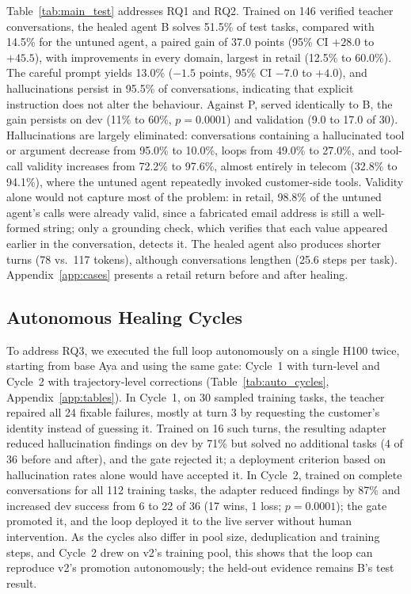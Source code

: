 \documentclass[11pt]{article}
\begin{document}
Table~\ref{tab:main_test} addresses RQ1 and RQ2. Trained on 146 verified teacher conversations, the healed agent B solves 51.5\% of test tasks, compared with 14.5\% for the untuned agent, a paired gain of 37.0 points (95\% CI $+28.0$ to $+45.5$), with improvements in every domain, largest in retail (12.5\% to 60.0\%). The careful prompt yields 13.0\% ($-1.5$ points, 95\% CI $-7.0$ to $+4.0$), and hallucinations persist in 95.5\% of conversations, indicating that explicit instruction does not alter the behaviour. Against P, served identically to B, the gain persists on dev (11\% to 60\%, $p=0.0001$) and validation (9.0 to 17.0 of 30). Hallucinations are largely eliminated: conversations containing a hallucinated tool or argument decrease from 95.0\% to 10.0\%, loops from 49.0\% to 27.0\%, and tool-call validity increases from 72.2\% to 97.6\%, almost entirely in telecom (32.8\% to 94.1\%), where the untuned agent repeatedly invoked customer-side tools. Validity alone would not capture most of the problem: in retail, 98.8\% of the untuned agent's calls were already valid, since a fabricated email address is still a well-formed string; only a grounding check, which verifies that each value appeared earlier in the conversation, detects it. The healed agent also produces shorter turns (78 vs.\ 117 tokens), although conversations lengthen (25.6 steps per task). Appendix~\ref{app:cases} presents a retail return before and after healing.

\subsection{Autonomous Healing Cycles}
\label{sec:exp_cycles}

To address RQ3, we executed the full loop autonomously on a single H100 twice, starting from base Aya and using the same gate: Cycle~1 with turn-level and Cycle~2 with trajectory-level corrections (Table~\ref{tab:auto_cycles}, Appendix~\ref{app:tables}). In Cycle~1, on 30 sampled training tasks, the teacher repaired all 24 fixable failures, mostly at turn 3 by requesting the customer's identity instead of guessing it. Trained on 16 such turns, the resulting adapter reduced hallucination findings on dev by 71\% but solved no additional tasks (4 of 36 before and after), and the gate rejected it; a deployment criterion based on hallucination rates alone would have accepted it. In Cycle~2, trained on complete conversations for all 112 training tasks, the adapter reduced findings by 87\% and increased dev success from 6 to 22 of 36 (17 wins, 1 loss; $p=0.0001$); the gate promoted it, and the loop deployed it to the live server without human intervention. As the cycles also differ in pool size, deduplication and training steps, and Cycle~2 drew on v2's training pool, this shows that the loop can reproduce v2's promotion autonomously; the held-out evidence remains B's test result.
\end{document}
